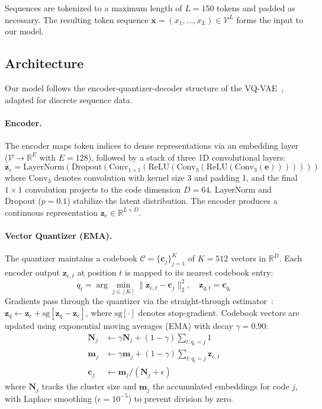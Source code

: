 \documentclass[pmlr]{jmlr}%
\begin{document}
Sequences are tokenized to a maximum length of $L = 150$ tokens and padded as necessary. The resulting token sequence $\mathbf{x} = (x_1, \ldots, x_L) \in \mathcal{V}^L$ forms the input to our model.

\subsection{Architecture}
\label{sec:architecture}

Our model follows the encoder-quantizer-decoder structure of the VQ-VAE~\citep{van2017neural}, adapted for discrete sequence data.

\paragraph{Encoder.}
The encoder maps token indices to dense representations via an embedding layer ($\mathcal{V} \rightarrow \mathbb{R}^{E}$ with $E = 128$), followed by a stack of three 1D convolutional layers:
\begin{equation}
    \mathbf{z}_e = \text{LayerNorm}(\text{Dropout}(\text{Conv}_{1 \times 1}(\text{ReLU}(\text{Conv}_{3}(\text{ReLU}(\text{Conv}_{3}(\mathbf{e})))))))
\end{equation}
where $\text{Conv}_{3}$ denotes convolution with kernel size 3 and padding 1, and the final $1 \times 1$ convolution projects to the code dimension $D = 64$. LayerNorm and Dropout ($p = 0.1$) stabilize the latent distribution. The encoder produces a continuous representation $\mathbf{z}_e \in \mathbb{R}^{L \times D}$.

\paragraph{Vector Quantizer (EMA).}
The quantizer maintains a codebook $\mathcal{C} = \{\mathbf{c}_j\}_{j=1}^{K}$ of $K = 512$ vectors in $\mathbb{R}^{D}$. Each encoder output $\mathbf{z}_{e,t}$ at position $t$ is mapped to its nearest codebook entry:
\begin{equation}
    q_t = \arg\min_{j \in [K]} \|\mathbf{z}_{e,t} - \mathbf{c}_j\|_2^2, \quad \mathbf{z}_{q,t} = \mathbf{c}_{q_t}
\end{equation}
Gradients pass through the quantizer via the straight-through estimator~\citep{bengio2013estimating}: $\mathbf{z}_q \leftarrow \mathbf{z}_e + \text{sg}[\mathbf{z}_q - \mathbf{z}_e]$, where $\text{sg}[\cdot]$ denotes stop-gradient. Codebook vectors are updated using exponential moving averages (EMA) with decay $\gamma = 0.90$:
\begin{align}
    \mathbf{N}_j &\leftarrow \gamma \mathbf{N}_j + (1 - \gamma) \sum_{t: q_t = j} 1 \\
    \mathbf{m}_j &\leftarrow \gamma \mathbf{m}_j + (1 - \gamma) \sum_{t: q_t = j} \mathbf{z}_{e,t} \\
    \mathbf{c}_j &\leftarrow \mathbf{m}_j / (\mathbf{N}_j + \epsilon)
\end{align}
where $\mathbf{N}_j$ tracks the cluster size and $\mathbf{m}_j$ the accumulated embeddings for code $j$, with Laplace smoothing ($\epsilon = 10^{-5}$) to prevent division by zero.
\end{document}
